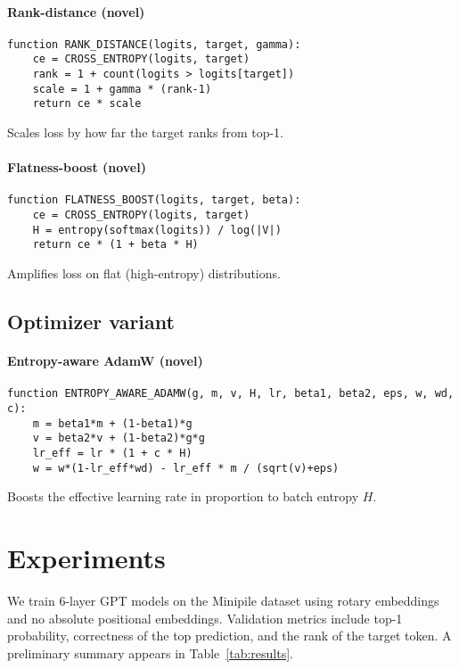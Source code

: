 \documentclass{article}
\begin{document}
\paragraph{Rank-distance \textbf{(novel)}}
\begin{lstlisting}
function RANK_DISTANCE(logits, target, gamma):
    ce = CROSS_ENTROPY(logits, target)
    rank = 1 + count(logits > logits[target])
    scale = 1 + gamma * (rank-1)
    return ce * scale
\end{lstlisting}
Scales loss by how far the target ranks from top-1.

\paragraph{Flatness-boost \textbf{(novel)}}
\begin{lstlisting}
function FLATNESS_BOOST(logits, target, beta):
    ce = CROSS_ENTROPY(logits, target)
    H = entropy(softmax(logits)) / log(|V|)
    return ce * (1 + beta * H)
\end{lstlisting}
Amplifies loss on flat (high-entropy) distributions.

\subsection{Optimizer variant}

\paragraph{Entropy-aware AdamW \textbf{(novel)}}
\begin{lstlisting}
function ENTROPY_AWARE_ADAMW(g, m, v, H, lr, beta1, beta2, eps, w, wd, c):
    m = beta1*m + (1-beta1)*g
    v = beta2*v + (1-beta2)*g*g
    lr_eff = lr * (1 + c * H)
    w = w*(1-lr_eff*wd) - lr_eff * m / (sqrt(v)+eps)
\end{lstlisting}
Boosts the effective learning rate in proportion to batch entropy $H$.

\section{Experiments}
We train 6-layer GPT models on the Minipile dataset using rotary embeddings and no absolute positional embeddings. Validation metrics include top-1 probability, correctness of the top prediction, and the rank of the target token. A preliminary summary appears in Table~\ref{tab:results}.
\end{document}

